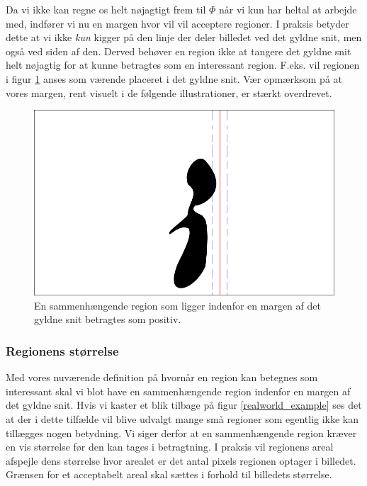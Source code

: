 {Da vi ikke kan regne os helt nøjagtigt frem til $\varPhi$ når vi
kun har heltal at arbejde med, indfører vi nu en margen hvor vil vil
acceptere regioner. I praksis betyder dette at vi ikke \emph{kun} kigger
på den linje der deler billedet ved det gyldne snit, men også ved siden
af den. Derved behøver en region ikke at tangere det gyldne snit helt
nøjagtig for at kunne betragtes som en interessant region. F.eks. vil
regionen i figur \ref{pos_naiv_margin_1} anses som værende placeret i
det gyldne snit. Vær opmærksom på at vores margen, rent visuelt i de
følgende illustrationer, er stærkt overdrevet.
\begin{figure}[h]
	\begin{center}
		\includegraphics[scale=\imgscale,angle=0]{afsnit/vores_implementation/billeder/naiv_algoritme/naiv_positiv_blob_margin_1}
	\end{center}
	\caption[Positiv region i margen]{En sammenhængende region som ligger indenfor en margen
	af det gyldne snit betragtes som positiv.}
	\label{pos_naiv_margin_1}
\end{figure}

\subsubsection{Regionens størrelse}
Med vores nuværende definition på hvornår en region kan betegnes som
interessant skal vi blot have en sammenhængende region indenfor en
margen af det gyldne snit. Hvis vi kaster et blik tilbage på figur
\ref{realworld_example} ses det at der i dette tilfælde vil blive
udvalgt mange små regioner som egentlig ikke kan tillægges nogen
betydning. Vi siger derfor at en sammenhængende region kræver en vis
størrelse før den kan tages i betragtning. I praksis vil regionens areal
afspejle dens størrelse hvor arealet er det antal pixels regionen
optager i billedet. Grænsen for et acceptabelt areal skal sættes i
forhold til billedets størrelse.

}
